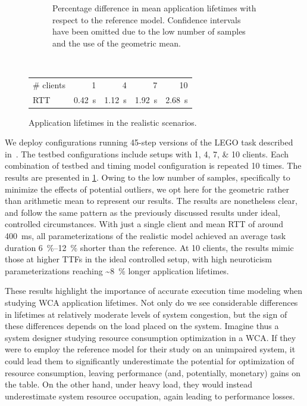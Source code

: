 \begin{figure}
\begin{subfigure}[t]{.45\textwidth}
        \caption{%
            Percentage difference in mean application lifetimes with respect to the reference model.
            Confidence intervals have been omitted due to the low number of samples and the use of the geometric mean.
        }
    \end{subfigure}\\
    \bigskip
    \begin{subtable}{\columnwidth}
        \centering
        \begin{tabular}{lrrrr}
            \toprule
            \# clients & 1 & 4 & 7 & 10 \\
            \gls{RTT} & \SI{0.42}{\second} & \SI{1.12}{\second} & \SI{1.92}{\second} & \SI{2.68}{\second} \\
            \bottomrule
        \end{tabular}
        \caption{Mean measured \glspl{RTT} for each testbed configuration.}
    \end{subtable}
    \caption{Application lifetimes in the realistic scenarios.}\label{fig:testbed_lifetimes}
\end{figure}

We deploy configurations running \num{45}-step versions of the LEGO task described in~\cite{olguinmunoz2021impact}.
The testbed configurations include setups with \numlist{1;4;7;10} clients.
Each combination of testbed and timing model configuration is repeated \num{10} times.
The results are presented in \cref{fig:testbed_lifetimes}.
Owing to the low number of samples, specifically to minimize the effects of potential outliers, we opt here for the geometric rather than arithmetic mean to represent our results.
The results are nonetheless clear, and follow the same pattern as the previously discussed results under ideal, controlled circumstances.
With just a single client and mean \gls{RTT} of around \SI{400}{\milli\second}, all parameterizations of the realistic model achieved an average task duration \SIrange{6}{12}{\percent} shorter than the reference.
At \num{10} clients, the results mimic those at higher \glspl{TTF} in the ideal controlled setup, with high neuroticism parameterizations reaching \textasciitilde\SI{8}{\percent} longer application lifetimes.

These results highlight the importance of accurate execution time modeling when studying \gls{WCA} application lifetimes.
Not only do we see considerable differences in lifetimes at relatively moderate levels of system congestion, but the sign of these differences depends on the load placed on the system.
Imagine thus a system designer studying resource consumption optimization in a \gls{WCA}.
If they were to employ the reference model for their study on an unimpaired system, it could lead them to significantly underestimate the potential for optimization of resource consumption, leaving performance (and, potentially, monetary) gains on the table.
On the other hand, under heavy load, they would instead underestimate system resource occupation, again leading to performance losses.